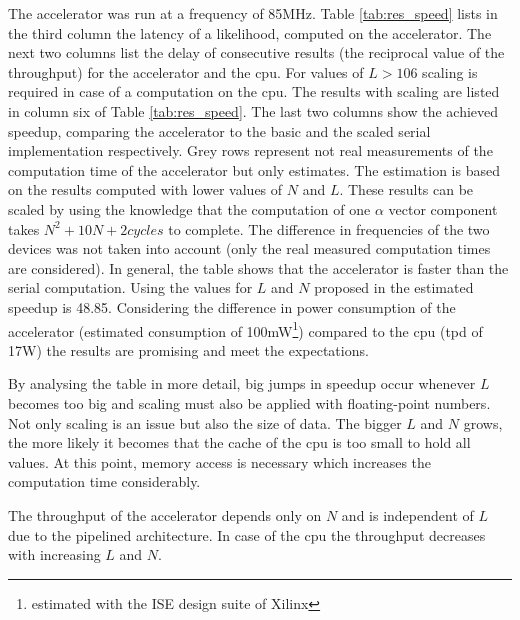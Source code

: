 \documentclass[mscthesis]{usiinfthesis}
\begin{document}
The accelerator was run at a frequency of 85MHz. Table \ref{tab:res_speed}
lists in the third column the latency of a likelihood, computed on the
accelerator. The next two columns list the delay of consecutive results (the
reciprocal value of the throughput) for the accelerator and the \gls{cpu}. For
values of $L > 106$ scaling is required in case of a computation on the
\gls{cpu}. The results with scaling are listed in column six of Table
\ref{tab:res_speed}. The last two columns show the achieved speedup, comparing
the accelerator to the basic and the scaled serial implementation respectively.
Grey rows represent not real measurements of the computation time of the
accelerator but only estimates. The estimation is based on the results computed
with lower values of $N$ and $L$. These results can be scaled by using the
knowledge that the computation of one $\alpha$ vector component takes $N^2
+ 10N +2 cycles$ to complete. The difference in frequencies of the two devices
was not taken into account (only the real measured computation times are
considered). In general, the table shows that the accelerator is faster than
the serial computation. Using the values for $L$ and $N$ proposed in
\cite{salfner08} the estimated speedup is 48.85. Considering the difference in
power consumption of the accelerator (estimated consumption of
100mW\footnote{estimated with the ISE design suite of Xilinx}) compared to the
\gls{cpu} (\gls{tpd} of 17W) the results are promising and meet the
expectations.

By analysing the table in more detail, big jumps in speedup occur whenever $L$
becomes too big and scaling must also be applied with floating-point numbers.
Not only scaling is an issue but also the size of data. The bigger $L$ and $N$
grows, the more likely it becomes that the cache of the \gls{cpu} is too small
to hold all values. At this point, memory access is necessary which increases
the computation time considerably.

The throughput of the accelerator depends only on $N$ and is independent of $L$
due to the pipelined architecture. In case of the \gls{cpu} the throughput
decreases with increasing $L$ and $N$.
\end{document}
